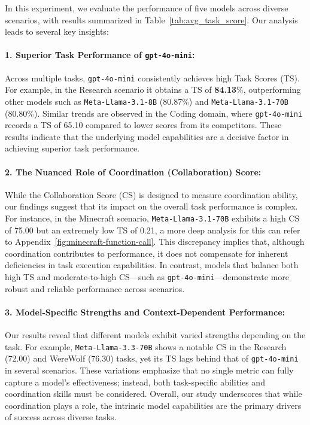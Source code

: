 

In this experiment, we evaluate the performance of five models across diverse scenarios, with results summarized in Table~\ref{tab:avg_task_score}. Our analysis leads to several key insights:

\paragraph{1. Superior Task Performance of \texttt{gpt-4o-mini}:}  
Across multiple tasks, \texttt{gpt-4o-mini} consistently achieves high Task Scores (TS). For example, in the Research scenario it obtains a TS of \textbf{84.13}\%, outperforming other models such as \texttt{Meta-Llama-3.1-8B} (80.87\%) and \texttt{Meta-Llama-3.1-70B} (80.80\%). Similar trends are observed in the Coding domain, where \texttt{gpt-4o-mini} records a TS of 65.10 compared to lower scores from its competitors. These results indicate that the underlying model capabilities are a decisive factor in achieving superior task performance.

\paragraph{2. The Nuanced Role of Coordination (Collaboration) Score:}  
While the Collaboration Score (CS) is designed to measure coordination ability, our findings suggest that its impact on the overall task performance is complex. For instance, in the Minecraft scenario, \texttt{Meta-Llama-3.1-70B} exhibits a high CS of 75.00 but an extremely low TS of 0.21, a more deep analysis for this can refer to Appendix~\ref{fig:minecraft-function-call}. This discrepancy implies that, although coordination contributes to performance, it does not compensate for inherent deficiencies in task execution capabilities. In contrast, models that balance both high TS and moderate-to-high CS—such as \texttt{gpt-4o-mini}—demonstrate more robust and reliable performance across scenarios.

\paragraph{3. Model-Specific Strengths and Context-Dependent Performance:}  
Our results reveal that different models exhibit varied strengths depending on the task. For example, \texttt{Meta-Llama-3.3-70B} shows a notable CS in the Research (72.00) and WereWolf (76.30) tasks, yet its TS lags behind that of \texttt{gpt-4o-mini} in several scenarios. These variations emphasize that no single metric can fully capture a model’s effectiveness; instead, both task-specific abilities and coordination skills must be considered. Overall, our study underscores that while coordination plays a role, the intrinsic model capabilities are the primary drivers of success across diverse tasks.


